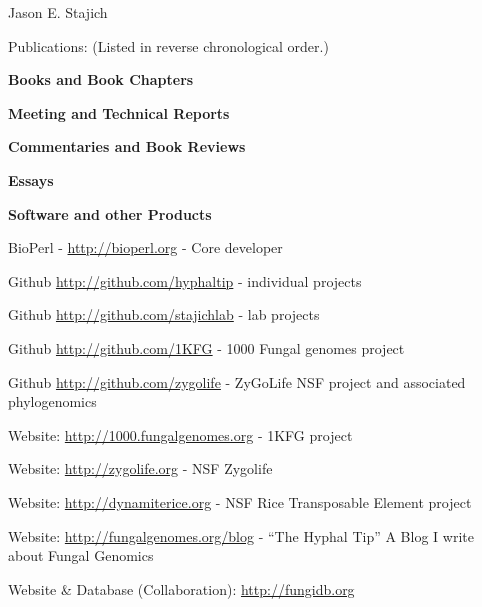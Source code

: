 \documentclass[10pt]{article}
\begin{document}
\begin{cv}{\centerline{Jason E. Stajich}}
\begin{cvlist}{Publications: (Listed in reverse chronological order.)}
  \item \textbf{Books and Book Chapters} 


\item \textbf{Meeting and Technical Reports}


\item \textbf{Commentaries and Book Reviews}

  
\item \textbf{Essays}
  
\begin{cvlistcompact}{\bf Software and other Products}
  \item BioPerl - \url{http://bioperl.org} - Core developer
\item Github \url{http://github.com/hyphaltip} - individual
  projects
\item Github \url{http://github.com/stajichlab} - lab
  projects

 \item Github \url{http://github.com/1KFG} - 1000 Fungal
   genomes project
\item Github \url{http://github.com/zygolife} - ZyGoLife NSF project
  and associated phylogenomics
\item Website: \url{http://1000.fungalgenomes.org} - 1KFG project
\item Website: \url{http://zygolife.org} - NSF Zygolife
\item Website: \url{http://dynamiterice.org} - NSF Rice Transposable
    Element project
\item Website: \url{http://fungalgenomes.org/blog} - ``The Hyphal
  Tip'' A Blog I write about Fungal Genomics
\item Website \& Database (Collaboration): \url{http://fungidb.org}
\end{cvlistcompact}



\end{cvlist}
\end{cv}
\end{document}
